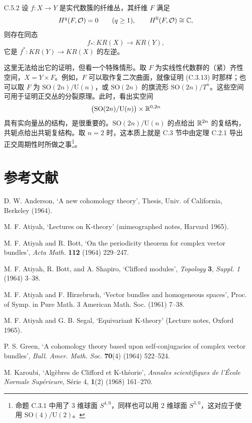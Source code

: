 \begin{proposition*}{C.5.2}
  设 $f\colon X\to Y$ 是实代数簇的纤维丛，其纤维 $F$ 满足
  \[
    H^{q}(F,\mathcal{O})=0\qquad(q\ge 1),\qquad H^{0}(F,\mathcal{O})\cong\mathbb{C},
  \]
  则存在同态
  \[
    f_{*}\colon KR(X)\to KR(Y),
  \]
  它是 $f^{*}\colon KR(Y)\to KR(X)$ 的左逆。
\end{proposition*}

这里无法给出它的证明，但看一个特殊情形。取 $F$ 为实线性代数群的（紧）齐性空间，$X=Y\times F$。例如，$F$ 可以取作复二次曲面，就像证明 (C.3.13) 时那样；也可以取 $F$ 为 $\mathrm{SO}(2n)/\mathrm{U}(n)$，或 $\mathrm{SO}(2n)$ 的旗流形 $\mathrm{SO}(2n)/T^{n}$。这些空间可用于证明正交丛的分裂原理。此时，看出实空间
\[
  \bigl(\mathrm{SO}(2n)/\mathrm{U}(n)\bigr)\times\mathbb{R}^{0,2n}
\]
具有实向量丛的结构，是很重要的。$\mathrm{SO}(2n)/\mathrm{U}(n)$ 的点给出 $\mathbb{R}^{2n}$ 的复结构，共轭点给出共轭复结构。取 $n=2$ 时，这本质上就是 C.3 节中由定理 C.2.1 导出正交周期性时所做之事\footnote{命题 C.3.1 中用了 $3$ 维球面 $S^{4,0}$，同样也可以用 $2$ 维球面 $S^{3,0}$，这对应于使用 $\mathrm{SO}(4)/\mathrm{U}(2)$。}。

\section*{参考文献}
\begingroup
\small
\noindent [1] D. W. Anderson, `A new cohomology theory', Thesis, Univ. of California, Berkeley (1964).

\noindent [2] M. F. Atiyah, `Lectures on K-theory' (mimeographed notes, Harvard 1965).

\noindent [3] M. F. Atiyah and R. Bott, `On the periodicity theorem for complex vector bundles', \textit{Acta Math.} \textbf{112} (1964) 229--247.

\noindent [4] M. F. Atiyah, R. Bott, and A. Shapiro, `Clifford modules', \textit{Topology} \textbf{3}, \textit{Suppl. 1} (1964) 3--38.

\noindent [5] M. F. Atiyah and F. Hirzebruch, `Vector bundles and homogeneous spaces', Proc. of Symp. in Pure Math. 3 American Math. Soc. (1961) 7--38.

\noindent [6] M. F. Atiyah and G. B. Segal, `Equivariant K-theory' (Lecture notes, Oxford 1965).

\noindent [7] P. S. Green, `A cohomology theory based upon self-conjugacies of complex vector bundles', \textit{Bull. Amer. Math. Soc.} \textbf{70}(4) (1964) 522--524.

\noindent [8] M. Karoubi, `Algèbres de Clifford et K-théorie', \textit{Annales scientifiques de l'École Normale Supérieure}, Série 4, \textbf{1}(2) (1968) 161--270.

